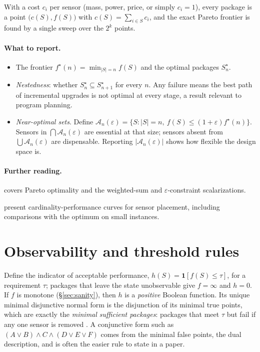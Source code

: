 \documentclass[11pt]{article}
\begin{document}
With a cost $c_i$ per sensor (mass, power, price, or simply $c_i=1$), every package is a point $\bigl(c(S),f(S)\bigr)$ with $c(S)=\sum_{i\in S}c_i$, and the exact Pareto frontier is found by a single sweep over the $2^k$ points.

\paragraph{What to report.}
\begin{itemize}[itemsep=2pt]
  \item The frontier $f^\star(n)=\min_{|S|=n}f(S)$ and the optimal packages $S_n^\star$.
  \item \emph{Nestedness}: whether $S_n^\star\subseteq S_{n+1}^\star$ for every $n$.
        Any failure means the best path of incremental upgrades is not optimal at every stage, a result relevant to program planning.
  \item \emph{Near-optimal sets}.
        Define $\mathcal{A}_n(\varepsilon)=\{S:|S|=n,\ f(S)\le(1+\varepsilon)f^\star(n)\}$.
        Sensors in $\bigcap\mathcal{A}_n(\varepsilon)$ are essential at that size; sensors absent from $\bigcup\mathcal{A}_n(\varepsilon)$ are dispensable.
        Reporting $|\mathcal{A}_n(\varepsilon)|$ shows how flexible the design space is.
\end{itemize}

\paragraph{Further reading.}
\begin{reading}
  \item[Mathematics.] \textcite{Ehrgott2005} covers Pareto optimality and the weighted-sum and $\varepsilon$-constraint scalarizations.
  \item[Applying it.] \textcite{Krause2008} present cardinality-performance curves for sensor placement, including comparisons with the optimum on small instances.
\end{reading}

\section{Observability and threshold rules}\label{sec:boolean}

Define the indicator of acceptable performance, $h(S)=\mathbf{1}[f(S)\le\tau]$, for a requirement $\tau$; packages that leave the state unobservable \parencite{HermannKrener1977} give $f=\infty$ and $h=0$.
If $f$ is monotone (\S\ref{sec:sanity}), then $h$ is a \emph{positive} Boolean function.
Its unique minimal disjunctive normal form is the disjunction of its minimal true points, which are exactly the \emph{minimal sufficient packages}: packages that meet $\tau$ but fail if any one sensor is removed \parencite{CramaHammer2011}.
A conjunctive form such as $(A\lor B)\land C\land(D\lor E\lor F)$ comes from the minimal false points, the dual description, and is often the easier rule to state in a paper.
\end{document}
